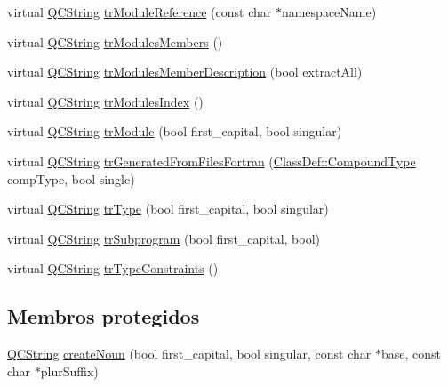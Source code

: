 \begin{DoxyCompactItemize}
\item 
virtual \hyperlink{class_q_c_string}{Q\-C\-String} \hyperlink{class_translator_swedish_a5b0385db8ce8e7c8251e31867c6fa8d5}{tr\-Module\-Reference} (const char $\ast$namespace\-Name)
\item 
virtual \hyperlink{class_q_c_string}{Q\-C\-String} \hyperlink{class_translator_swedish_a75279d9914e0cc54ee5f4b15ddaa234c}{tr\-Modules\-Members} ()
\item 
virtual \hyperlink{class_q_c_string}{Q\-C\-String} \hyperlink{class_translator_swedish_a26dd0f47c7f59841f901da7f4bd19306}{tr\-Modules\-Member\-Description} (bool extract\-All)
\item 
virtual \hyperlink{class_q_c_string}{Q\-C\-String} \hyperlink{class_translator_swedish_a8a71cbe9e0669d3555731c3ebc0aae35}{tr\-Modules\-Index} ()
\item 
virtual \hyperlink{class_q_c_string}{Q\-C\-String} \hyperlink{class_translator_swedish_a894e0b632e1680e918c78fea5b9b5384}{tr\-Module} (bool first\-\_\-capital, bool singular)
\item 
virtual \hyperlink{class_q_c_string}{Q\-C\-String} \hyperlink{class_translator_swedish_ab89226b80b72b0ff8f4fca99626097ba}{tr\-Generated\-From\-Files\-Fortran} (\hyperlink{class_class_def_a768a6f0a6fd7e9087ff7971abbcc3f36}{Class\-Def\-::\-Compound\-Type} comp\-Type, bool single)
\item 
virtual \hyperlink{class_q_c_string}{Q\-C\-String} \hyperlink{class_translator_swedish_a2763a6af55d1ca03be54604c2bc4a3b4}{tr\-Type} (bool first\-\_\-capital, bool singular)
\item 
virtual \hyperlink{class_q_c_string}{Q\-C\-String} \hyperlink{class_translator_swedish_a846dd82fc65dff6af6ace0364ad303cb}{tr\-Subprogram} (bool first\-\_\-capital, bool)
\item 
virtual \hyperlink{class_q_c_string}{Q\-C\-String} \hyperlink{class_translator_swedish_a196f3eb690f2748ee71f518cf02bd7fe}{tr\-Type\-Constraints} ()
\end{DoxyCompactItemize}
\subsection*{Membros protegidos}
\begin{DoxyCompactItemize}
\item 
\hyperlink{class_q_c_string}{Q\-C\-String} \hyperlink{class_translator_swedish_a7018908dc8eab4d236d1126c1c311690}{create\-Noun} (bool first\-\_\-capital, bool singular, const char $\ast$base, const char $\ast$plur\-Suffix)
\end{DoxyCompactItemize}
